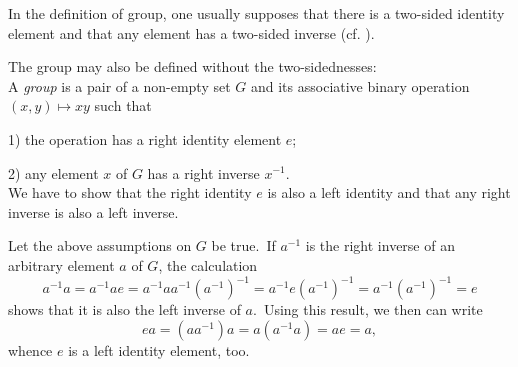 \documentclass[12pt]{article}
\begin{document}
In the definition of group, one usually supposes that there is a two-sided identity element and that 
any element has a two-sided inverse (cf. ).

The group may also be defined without the two-sidednesses:\\

A {\it group} is a pair of a non-empty set $G$ and its associative binary operation 
$(x,y) \mapsto xy$ such that

1) the operation has a right identity element $e$;

2) any element $x$ of $G$ has a right inverse $x^{-1}$.\\

We have to show that the right identity $e$ is also a left identity 
and that any right inverse is also a left inverse.

Let the above assumptions on $G$ be true.\, If $a^{-1}$ is the right 
inverse of an arbitrary element $a$ of $G$, the calculation
$$a^{-1}a = a^{-1}ae = a^{-1}aa^{-1}(a^{-1})^{-1} = 
a^{-1}e(a^{-1})^{-1} = a^{-1}(a^{-1})^{-1} = e$$
shows that it is also the left inverse of $a$.\, Using this result, 
we then can write
$$ea = (aa^{-1})a = a(a^{-1}a) = ae = a,$$
whence $e$ is a left identity element, too.
\end{document}
